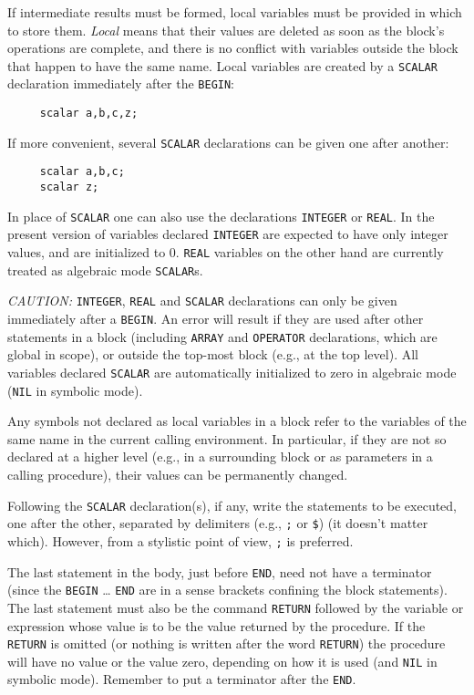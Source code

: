 \hypertarget{command:SCALAR}{}
\hypertarget{command:INTEGER}{}
\hypertarget{command:REAL}{}

If intermediate results must be formed, local variables must be provided
in which to store them. \emph{Local} means that their values are deleted as
soon as the block's operations are complete, and there is no conflict with
variables outside the block that happen to have the same name.  Local
variables are created by a \texttt{SCALAR} declaration
immediately after the \texttt{BEGIN}:
\begin{verbatim}
     scalar a,b,c,z;
\end{verbatim}
If more convenient, several \texttt{SCALAR} declarations can be given one after
another:
\begin{verbatim}
     scalar a,b,c;
     scalar z;
\end{verbatim}
In place of \texttt{SCALAR} one can also use the declarations
\texttt{INTEGER} or \texttt{REAL}.
In the present version of {\REDUCE} variables declared \texttt{INTEGER}
are expected to have only integer values, and are initialized to 0.
\texttt{REAL} variables on the other hand are currently treated as algebraic
mode \texttt{SCALAR}s.

\textit{CAUTION:} \texttt{INTEGER}, \texttt{REAL} and \texttt{SCALAR} declarations can
only be given immediately after a \texttt{BEGIN}.  An error will result if
they are used after other statements in a block (including \texttt{ARRAY} and
\texttt{OPERATOR} declarations, which are global in scope), or outside the
top-most block (e.g., at the top level).  All variables declared 
\texttt{SCALAR} are automatically initialized to zero in algebraic mode
(\texttt{NIL} in symbolic mode).

Any symbols not declared as local variables in a block refer to the
variables of the same name in the current calling environment. In
particular, if they are not so declared at a higher level (e.g., in a
surrounding block or as parameters in a calling procedure), their values can
be permanently changed.

Following the \texttt{SCALAR} declaration(s), if any, write the
statements to be executed, one after the other, separated by delimiters
(e.g., \texttt{;} or \texttt{\$}) (it doesn't matter which).  However, from a
stylistic point of view, \texttt{;} is preferred.

The last statement in the body, just before \texttt{END}, need not have a
terminator (since the \texttt{BEGIN} \ldots{} \texttt{END} are in a sense brackets
confining the block statements).  The last statement must also be the
command \texttt{RETURN} followed by the variable or
expression whose value is to be the value returned by the procedure.  If
the \texttt{RETURN} is omitted (or nothing is written after the word
\texttt{RETURN}) the procedure will have no value or the value zero, depending
on how it is used (and \texttt{NIL} in symbolic mode).  Remember to put a
terminator after the \texttt{END}.

